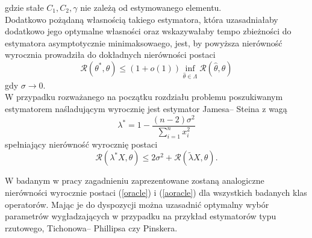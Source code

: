 \documentclass{article}
\begin{document}
gdzie stałe $C_1,C_2, \gamma$ nie zależą od estymowanego elementu.\\
Dodatkowo pożądaną własnością takiego estymatora, która uzasadniałaby dodatkowo jego optymalne własności oraz wskazywałaby tempo zbieżności do estymatora asymptotycznie minimaksowaego, jest, by powyższa nierówność wyrocznia prowadziła do dokładnych nierówności postaci
\begin{equation}\label{aoracle}
\mathcal{R}(\theta^*,\theta)\leq(1+o(1))\inf_{\hat{\theta} \in \Lambda}\mathcal{R}(\hat{\theta},\theta)
\end{equation}
gdy $\sigma\to 0$.\\
W przypadku rozważanego na początku rozdziału problemu poszukiwanym estymatorem naśladującym wyrocznię jest estymator Jamesa-- Steina z wagą
\begin{displaymath}
\lambda^*=1-\frac{(n-2)\sigma^2}{\sum_{i=1}^nx_i^2}
\end{displaymath}
spełniający nierówność wyrocznię postaci
\begin{displaymath}
\mathcal{R}(\lambda^*X,\theta)\leq 2\sigma^2+\mathcal{R}(\tilde{\lambda} X,\theta).
\end{displaymath}


W badanym w pracy zagadnieniu zaprezentowane zostaną analogiczne nierówności wyrocznie postaci (\ref{oracle}) i (\ref{aoracle}) dla wszystkich badanych klas operatorów. Mając je do dyspozycji można uzasadnić optymalny wybór parametrów wygładzających w przypadku na przykład estymatorów typu rzutowego, Tichonowa-- Phillipsa czy Pinskera.\\
\end{document}
